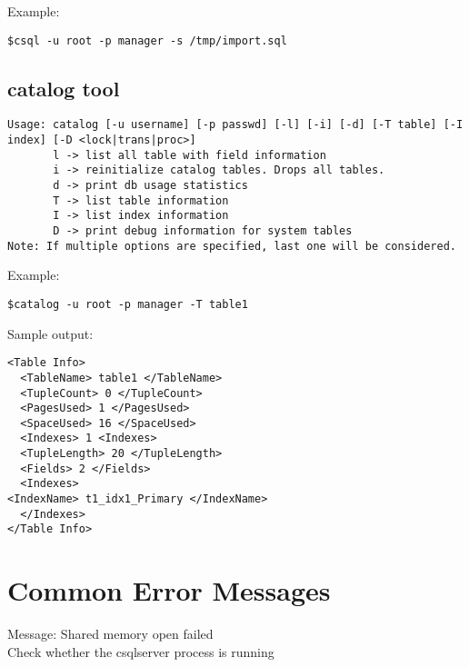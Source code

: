 \documentclass[12pt]{article}
\begin{document}
Example: 
\begin{verbatim}
$csql -u root -p manager -s /tmp/import.sql
\end{verbatim}

\subsection{catalog tool}
\label{catalogtool}
\begin{verbatim}
Usage: catalog [-u username] [-p passwd] [-l] [-i] [-d] [-T table] [-I index] [-D <lock|trans|proc>]
       l -> list all table with field information
       i -> reinitialize catalog tables. Drops all tables.
       d -> print db usage statistics
       T -> list table information
       I -> list index information
       D -> print debug information for system tables
Note: If multiple options are specified, last one will be considered.
\end{verbatim}

Example: 
\begin{verbatim}
$catalog -u root -p manager -T table1
\end{verbatim}
Sample output:
\begin{verbatim}
<Table Info> 
  <TableName> table1 </TableName>
  <TupleCount> 0 </TupleCount>
  <PagesUsed> 1 </PagesUsed>
  <SpaceUsed> 16 </SpaceUsed>
  <Indexes> 1 <Indexes>
  <TupleLength> 20 </TupleLength>
  <Fields> 2 </Fields>
  <Indexes>
<IndexName> t1_idx1_Primary </IndexName>
  </Indexes>
</Table Info> 
\end{verbatim}

\section{Common Error Messages}
\label{errormessages}
Message: Shared memory open failed  \\
Check whether the csqlserver process is running \\

\end{document}
